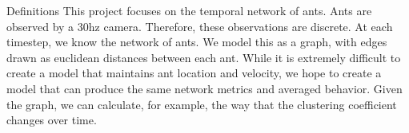 \documentclass{beamer}
\begin{document}





  \begin{frame}{Definitions}
      This project focuses on the temporal network of ants.
      Ants are observed by a 30hz camera.
      Therefore, these observations are discrete.
      At each timestep, we know the network of ants. 
      We model this as a graph, with edges drawn as euclidean distances between each ant.
      While it is extremely difficult to create a model that maintains ant location and velocity, we hope to create a model that can produce the same network metrics and averaged behavior.
      Given the graph, we can calculate, for example, the way that the clustering coefficient changes over time.
  \end{frame}
\end{document}
